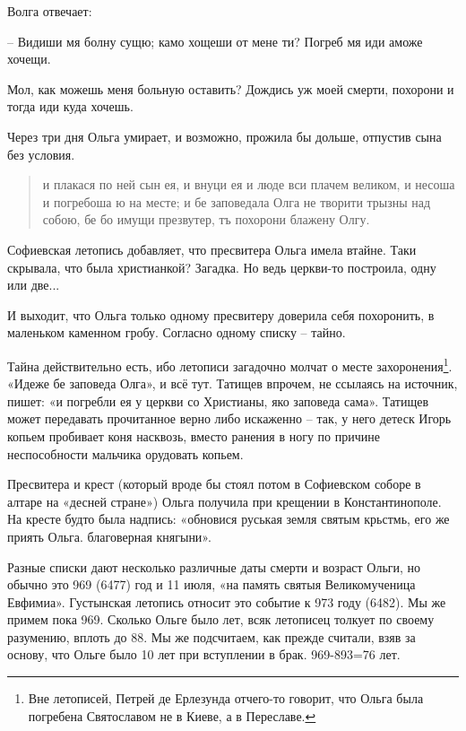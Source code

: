 Волга отвечает:

   – Видиши мя болну сущю; камо хощеши от мене ти? Погреб мя иди аможе хочещи.

Мол, как можешь меня больную оставить? Дождись уж моей смерти, похорони и тогда иди куда хочешь.

Через три дня Ольга умирает, и возможно, прожила бы дольше, отпустив сына без условия.

\begin{quotation} 
и плакася по ней сын ея, и внуци ея и люде вси плачем великом, и несоша и погребоша ю на месте; и бе заповедала Олга не творити трызны над собою, бе бо имущи презвутер, тъ похорони блажену Олгу.
\end{quotation} 

Софиевская летопись добавляет, что пресвитера Ольга имела втайне. Таки скрывала, что была христианкой? Загадка. Но ведь церкви-то построила, одну или две...


И выходит, что Ольга только одному пресвитеру доверила себя похоронить, в маленьком каменном гробу. Согласно одному списку – тайно.

Тайна действительно есть, ибо летописи загадочно молчат о месте захоронения\footnote{Вне летописей, Петрей де Ерлезунда отчего-то говорит, что Ольга была погребена Святославом не в Киеве, а в Переславе.}. «Идеже бе заповеда Олга», и всё тут. Татищев впрочем, не ссылаясь на источник, пишет: «и погребли ея у церкви со Христианы, яко заповеда сама». Татищев может передавать прочитанное верно либо искаженно – так, у него детеск Игорь копьем пробивает коня насквозь, вместо ранения в ногу по причине неспособности мальчика орудовать копьем.

Пресвитера и крест (который вроде бы стоял потом в Софиевском соборе в алтаре на «десней стране») Ольга получила при крещении в Константинополе. На кресте будто была надпись: «обновися руськая земля святым крьстмь, его же приять Ольга. благоверная княгыни».

Разные списки дают несколько различные даты смерти и возраст Ольги, но обычно это 969 (6477) год и 11 июля, «на память святыя Великомученица Евфимиа». Густынская летопись относит это событие к 973 году (6482). Мы же примем пока 969. Сколько Ольге было лет, всяк летописец толкует по своему разумению, вплоть до 88. Мы же подсчитаем, как прежде считали, взяв за основу, что Ольге было 10 лет при вступлении в брак. 969-893=76 лет.

